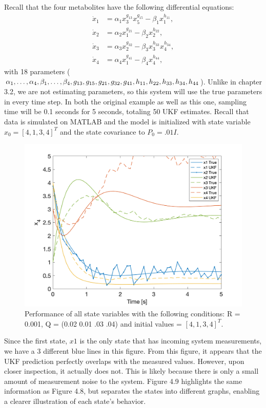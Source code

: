 \noindent Recall that the four metabolites have the following differential equations:
\begin{align*}
\dot x_1 &= \alpha_1 x_3^{g_{13}} x_5^{g_{15}} - \beta_1 x_1^{h_{11}}, \\
\dot x_2 &= \alpha_2 x_1^{g_{21}} - \beta_2 x_2^{h_{22}}, \\
\dot x_3 &= \alpha_3 x_2^{g_{32}} - \beta_3 x_3^{h_{33}} x_4^{h_{34}}, \\
\dot x_4 &= \alpha_4  x_1^{g_{41}} - \beta_4 x_4^{h_{44}},
\end{align*}
with 18 parameters ($\alpha_1, \hdots, \alpha_4, \beta_1, \hdots, \beta_4, g_{13}, g_{15}, g_{21}, \\ g_{32}, g_{41}, h_{11}, h_{22}, h_{33}, h_{34}, h_{44} $). Unlike in chapter 3.2, we are not estimating parameters, so this system will use the true parameters in every time step. In both the original example as well as this one, sampling time will be 0.1 seconds for 5 seconds, totaling 50 UKF estimates. Recall that data is simulated on MATLAB and the model is initialized with state variable $x_0 = [4, 1, 3, 4]^T$ and the state covariance to $P_0 = .01I$. 


\begin{figure}[h]
    \centering
    \includegraphics[scale = 0.6]{Meskin_overall.png}
    \caption{Performance of all state variables with the following conditions: R = 0.001, Q = (0.02 0.01 .03 .04) and initial values = $[4, 1, 3, 4]^T$.}
\end{figure}

\noindent Since the first state, $x1$ is the only state that has incoming system measurements, we have a 3 different blue lines in this figure. From this figure, it appears that the UKF prediction perfectly overlaps with the measured values. However, upon closer inspection, it actually does not. This is likely because there is only a small amount of measurement noise to the system. Figure 4.9 highlights the same information as Figure 4.8, but separates the states into different graphs, enabling a clearer illustration of each state's behavior.

